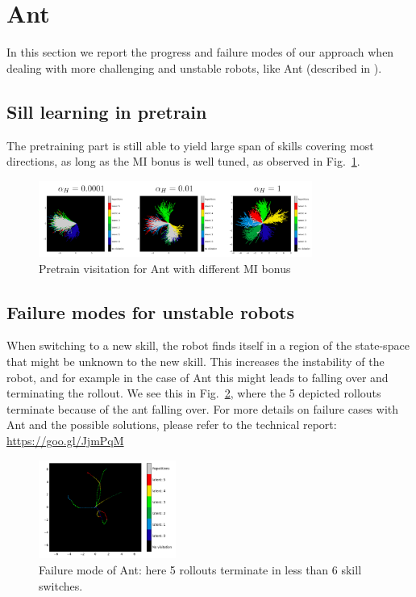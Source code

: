 \documentclass{article} %
\begin{document}
\section{Ant}
\label{sec:ant}
In this section we report the progress and failure modes of our approach when dealing with more challenging and unstable robots, like Ant (described in \cite{duan2016benchmarking}). 

\subsection{Sill learning in pretrain}
The pretraining part is still able to yield large span of skills covering most directions, as long as the MI bonus is well tuned, as observed in Fig.\ \ref{fig:ant-pretrain}.

\begin{figure}[h]
    \centering
    \includegraphics[width = 0.8\textwidth]{Figures/ant-pretrain-visitation.png}
    \caption{Pretrain visitation for Ant with different MI bonus}
    \label{fig:ant-pretrain}
\end{figure}

\subsection{Failure modes for unstable robots}
\label{sec:ant-failure}
When switching to a new skill, the robot finds itself in a region of the state-space that might be unknown to the new skill. This increases the instability of the robot, and for example in the case of Ant this might leads to falling over and terminating the rollout. We see this in Fig.\ \ref{fig:ant-failure}, where the 5 depicted rollouts terminate because of the ant falling over. For more details on failure cases with Ant and the possible solutions, please refer to the technical report: \url{https://goo.gl/JjmPqM}


\begin{figure}[h]
    \centering
    \includegraphics[width = 0.4\textwidth]{Figures/ant-failure.png}
    \caption{Failure mode of Ant: here 5 rollouts terminate in less than 6 skill switches.}
    \label{fig:ant-failure}
\end{figure}


\end{document}
